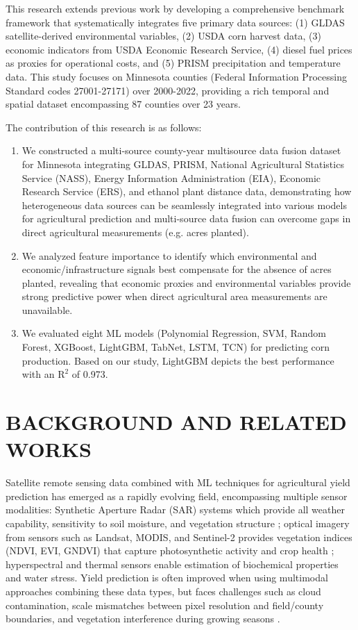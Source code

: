 \documentclass[10pt,twocolumn]{article}
\begin{document}
This research extends previous work by developing a comprehensive benchmark framework that systematically integrates five primary data sources: (1) GLDAS satellite-derived environmental variables, (2) USDA corn harvest data, (3) economic indicators from USDA Economic Research Service, (4) diesel fuel prices as proxies for operational costs, and (5) PRISM precipitation and temperature data. This study focuses on Minnesota counties (Federal Information Processing Standard codes 27001-27171) over 2000-2022, providing a rich temporal and spatial dataset encompassing 87 counties over 23 years.

The contribution of this research is as follows:

\begin{enumerate}
    \item We constructed a multi-source county-year multisource data fusion dataset for Minnesota integrating GLDAS, PRISM, National Agricultural Statistics Service (NASS), Energy Information Administration (EIA), Economic Research Service (ERS), and ethanol plant distance data, demonstrating how heterogeneous data sources can be seamlessly integrated into various models for agricultural prediction and multi-source data fusion can overcome gaps in direct agricultural measurements (e.g. acres planted).
    \item We analyzed feature importance to identify which environmental and economic/infrastructure signals best compensate for the absence of acres planted, revealing that economic proxies and environmental variables provide strong predictive power when direct agricultural area measurements are unavailable.
    \item We evaluated eight ML models (Polynomial Regression, SVM, Random Forest, XGBoost, LightGBM, TabNet, LSTM, TCN) for predicting corn production. Based on our study, LightGBM depicts the best performance with an $\mathrm{R}^{2}$ of 0.973.
\end{enumerate}

\section{BACKGROUND AND RELATED WORKS}

Satellite remote sensing data combined with ML techniques for agricultural yield prediction has emerged as a rapidly evolving field, encompassing multiple sensor modalities: Synthetic Aperture Radar (SAR) systems which provide all weather capability, sensitivity to soil moisture, and vegetation structure \cite{roy2025,desloires2024}; optical imagery from sensors such as Landsat, MODIS, and Sentinel-2 provides vegetation indices (NDVI, EVI, GNDVI) that capture photosynthetic activity and crop health \cite{kayad2019}; hyperspectral and thermal sensors enable estimation of biochemical properties and water stress. Yield prediction is often improved when using multimodal approaches combining these data types, but faces challenges such as cloud contamination, scale mismatches between pixel resolution and field/county boundaries, and vegetation interference during growing seasons \cite{singh2025}.
\end{document}
